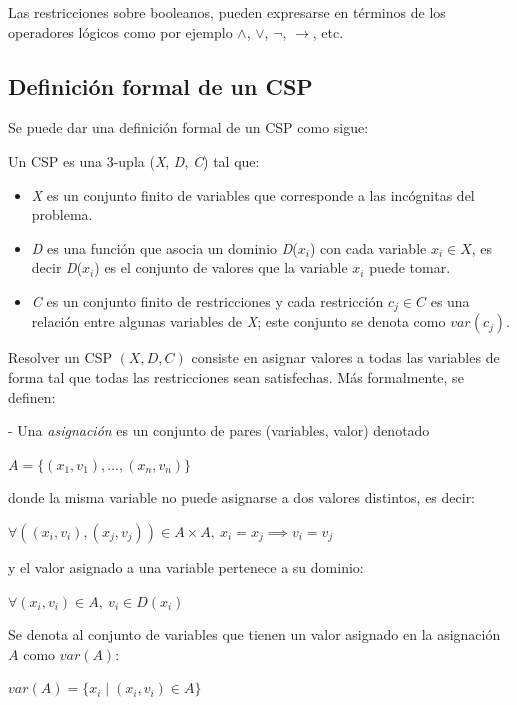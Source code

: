 \documentclass{llncs}
\begin{document}
      Las restricciones sobre booleanos, pueden expresarse en términos de los operadores
      lógicos como por ejemplo $\wedge$, $\lor$, $\neg$, $\rightarrow$, etc.
      
    \subsection{Definici\'on formal de un CSP}
      Se puede dar una definici\'on formal de un CSP como sigue:
      
      Un CSP es una 3-upla (\textit{X}, \textit{D}, \textit{C}) tal que:
      \begin{itemize}
        \item \textit{X} es un conjunto finito de variables que corresponde a las inc\'ognitas del problema.
        \item \textit{D} es una funci\'on que asocia un dominio \textit{D}($x_i$) con cada variable $x_i \in \textit{X}$, es
        decir \textit{D}($x_i$) es el conjunto de valores que la variable $x_i$ puede tomar.
        \item \textit{C} es un conjunto finito de restricciones y cada restricci\'on $c_j \in C$ es una relaci\'on entre
        algunas variables de \textit{X}; este conjunto se denota como $var(c_j).$
      \end{itemize}
  
  	Resolver un CSP $(X, D, C)$ consiste en asignar valores a todas las variables de forma tal
  	que todas las restricciones sean satisfechas. Más formalmente, se definen:
  	
  	- Una \textit{asignación} es un conjunto de pares (variables, valor) denotado
  	\begin{center}
  		{$A = \{(x_1, v_1), ..., (x_n, v_n)\}$} 
  	\end{center}
  	donde la misma variable no puede asignarse a dos valores distintos, es decir:
  	\begin{center}
  		{$\forall((x_i, v_i), (x_j,v_j)) \in A \times A,\ x_i = x_j \implies v_i = v_j$}
  	\end{center}
  	y el valor asignado a una variable pertenece a su dominio:
  	\begin{center}
  		{$\forall(x_i, v_i) \in A,\ v_i \in D(x_i)$}
  	\end{center}
     Se denota al conjunto de variables que tienen un valor asignado en la asignación $A$ como
     $var(A)$:
     \begin{center}
     	$var(A) = \{x_i \mid (x_i, v_i) \in A\}$
     \end{center}
 
\end{document}
